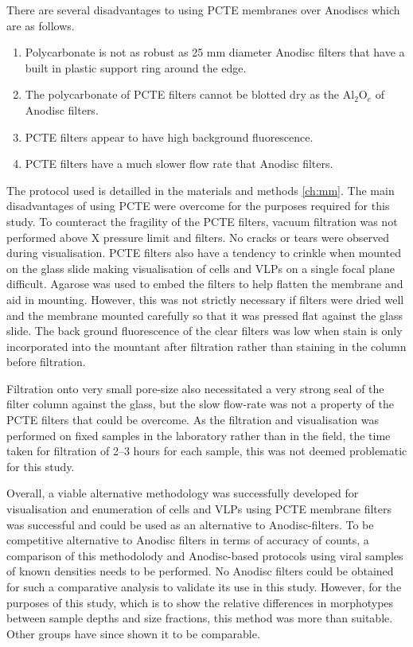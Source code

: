 There are several disadvantages to using \ac{PCTE} membranes over Anodiscs which are as follows.
\begin{enumerate}
\item Polycarbonate is not as robust as 25 mm diameter Anodisc filters that have a built in plastic support ring around the edge.
\item The polycarbonate of \ac{PCTE} filters cannot be blotted dry as the Al$_{2}$O$_{e}$ of Anodisc filters.
\item \ac{PCTE} filters appear to have high background fluorescence. %
\item \ac{PCTE} filters have a much slower flow rate that Anodisc filters. %
\end{enumerate}

The protocol used is detailled in the materials and methods \ref{ch:mm}.
The main disadvantages of using \ac{PCTE} were overcome for the purposes required for this study.
To counteract the fragility of the \ac{PCTE} filters, vacuum filtration was not performed above X pressure limit and filters.
No cracks or tears were observed during visualisation.
\ac{PCTE} filters also have a tendency to crinkle when mounted on the glass slide making visualisation of cells and \acp{VLP} on a single focal plane difficult.
Agarose was used to embed the filters to help flatten the membrane and aid in mounting.
However, this was not strictly necessary if filters were dried well and the membrane mounted carefully so that it was pressed flat against the glass slide.
The back ground fluorescence of the clear filters was low when stain is only incorporated into the mountant after filtration rather than staining in the column before filtration.

Filtration onto very small pore-size also necessitated a very strong seal of the filter column against the glass, but the slow flow-rate was not a property of the \ac{PCTE} filters that could be overcome.
As the filtration and visualisation was performed on fixed samples in the laboratory rather than in the field, the time taken for filtration of 2--3 hours for each sample, this was not deemed problematic for this study.

Overall, a viable alternative methodology was successfully developed for visualisation and enumeration of cells and \acp{VLP} using \ac{PCTE} membrane filters was successful and could be used as an alternative to Anodisc-filters.
To be competitive alternative to Anodisc filters in terms of accuracy of counts, a comparison of this methodolody and Anodisc-based protocols using viral samples of known densities needs to be performed.
No Anodisc filters could be obtained for such a comparative analysis to validate its use in this study.
However, for the purposes of this study, which is to show the relative differences in morphotypes between sample depths and size fractions, this method was more than suitable.
Other groups have since shown it to be comparable. %


